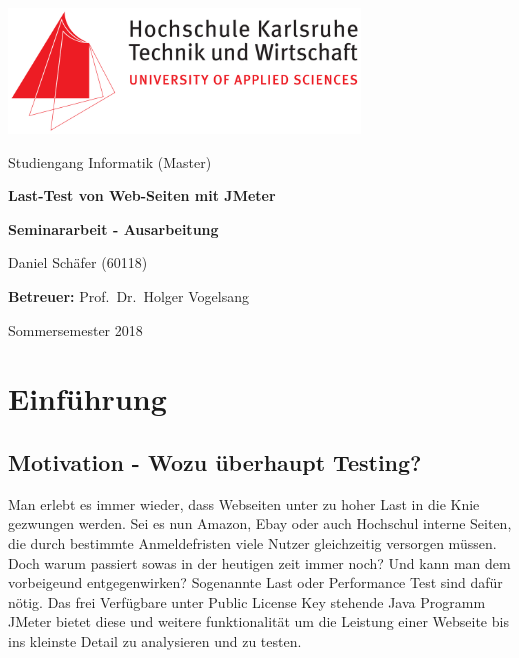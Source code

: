\documentclass[a4paper,12pt]{article}
\begin{document}
\begin{titlepage}
	\centering
	\includegraphics[width=0.7\textwidth]{bilder/hskalogo}\par\vspace{1cm}
	\vspace{0.5cm}
	{\Large Studiengang Informatik (Master)}\par
	\vspace{2cm}
	{\huge\bfseries Last-Test von Web-Seiten mit JMeter}\par
	\vspace{2cm}
	{\Large\bfseries Seminararbeit - Ausarbeitung}\par
	\vspace{0.5cm}
	\vspace{3cm}
	
	{\Large Daniel Schäfer (60118)\par}
	\vspace{1cm}
	{\Large\textbf{Betreuer:} Prof.~Dr.~Holger Vogelsang} 
	\vfill
	{\Large Sommersemester 2018\par}
	\vfill
\end{titlepage}


\tableofcontents
\pagebreak

\section{Einführung}
\subsection{Motivation - Wozu überhaupt Testing?}
Man erlebt es immer wieder, dass Webseiten unter zu hoher Last in die Knie gezwungen werden. Sei es nun Amazon, Ebay oder auch Hochschul interne Seiten, die durch bestimmte Anmeldefristen viele Nutzer gleichzeitig versorgen müssen. Doch warum passiert sowas in der heutigen zeit immer noch? Und kann man dem vorbeigeund entgegenwirken? Sogenannte Last oder Performance Test sind dafür nötig. Das frei Verfügbare unter Public License Key stehende Java Programm JMeter bietet diese und weitere funktionalität um die Leistung einer Webseite bis ins kleinste Detail zu analysieren und zu testen.
\end{document}
